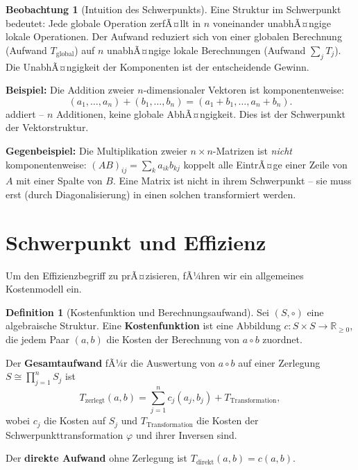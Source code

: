 ﻿\documentclass[a4paper,12pt]{report}
\theoremstyle{definition}
\newtheorem{definition}{Definition}
\newtheorem{beobachtung}{Beobachtung}
\begin{document}
\begin{beobachtung}[Intuition des Schwerpunkts]
    Eine Struktur im Schwerpunkt bedeutet: Jede globale Operation
    zerfÃ¤llt in $n$ voneinander unabhÃ¤ngige lokale Operationen.
    Der Aufwand reduziert sich von einer globalen Berechnung
    (Aufwand $T_{\mathrm{global}}$) auf $n$ unabhÃ¤ngige lokale
    Berechnungen (Aufwand $\sum_j T_j$). Die UnabhÃ¤ngigkeit der
    Komponenten ist der entscheidende Gewinn.

    \textbf{Beispiel:} Die Addition zweier $n$-di\-men\-sio\-na\-ler Vektoren
    ist komponentenweise:
    \[
        (a_1,\ldots,a_n) + (b_1,\ldots,b_n) = (a_1+b_1, \ldots, a_n+b_n).
    \]
    addiert -- $n$ Additionen, keine globale AbhÃ¤ngigkeit. Dies ist
    der Schwerpunkt der Vektorstruktur.

    \textbf{Gegenbeispiel:} Die Multiplikation zweier $n \times n$-Matrizen
    ist \emph{nicht} komponentenweise: $(AB)_{ij} = \sum_k a_{ik} b_{kj}$
    koppelt alle EintrÃ¤ge einer Zeile von $A$ mit einer Spalte von $B$.
    Eine Matrix ist nicht in ihrem Schwerpunkt -- sie muss erst
    (durch Diagonalisierung) in einen solchen transformiert werden.
\end{beobachtung}

\section{Schwerpunkt und Effizienz}

Um den Effizienzbegriff zu prÃ¤zisieren, fÃ¼hren wir ein allgemeines
Kostenmodell ein.

\begin{definition}[Kostenfunktion und Berechnungsaufwand]
    Sei $(S, \circ)$ eine algebraische Struktur. Eine
    \textbf{Kostenfunktion} ist eine Abbildung $c : S \times S \to \mathbb{R}_{\geq 0}$,
    die jedem Paar $(a, b)$ die Kosten der Berechnung von $a \circ b$ zuordnet.

    Der \textbf{Gesamtaufwand} fÃ¼r die Auswertung von $a \circ b$ auf
    einer Zerlegung $S \cong \prod_{j=1}^n S_j$ ist
    \[
        T_{\mathrm{zerlegt}}(a, b)
        = \sum_{j=1}^n c_j(a_j, b_j) + T_{\mathrm{Transformation}},
    \]
    wobei $c_j$ die Kosten auf $S_j$ und $T_{\mathrm{Transformation}}$
    die Kosten der Schwerpunkttransformation $\varphi$ und ihrer
    Inversen sind.

    Der \textbf{direkte Aufwand} ohne Zerlegung ist
    $T_{\mathrm{direkt}}(a, b) = c(a, b)$.
\end{definition}
\end{document}
